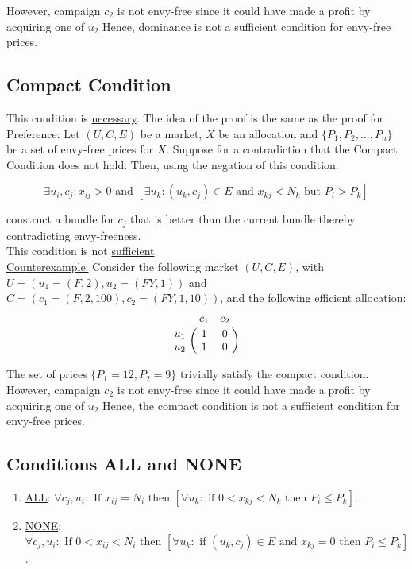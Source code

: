 \documentclass[12pt,letterpaper]{article}
\newcommand{\Campaign}{c}
\newcommand{\Campaigns}{C}
\newcommand{\User}{u}
\newcommand{\Users}{U}
\newcommand{\NumberOfUsers}{N}
\newcommand{\Edges}{E}
\newcommand{\Price}{P}
\newcommand{\AllocationMatrix}{X}
\newcommand{\AllocationMatrixEntry}{x}
\begin{document}
	However, campaign $\Campaign_{2}$ is not envy-free since it could have made a profit by acquiring one of $\User_{2}$ 
	Hence, dominance is not a sufficient condition for envy-free prices.


\subsection*{Compact Condition}

This condition is \underline{necessary}. The idea of the proof is the same as the proof for Preference: 
Let $(\Users,\Campaigns,\Edges)$ be a market, $X$ be an allocation and $\{\Price_1,\Price_2,\ldots,\Price_n\}$ be a set of envy-free prices for $\AllocationMatrix$.
Suppose for a contradiction that the Compact Condition does not hold. Then, using the negation of this condition:

  $$\exists \User_i,\Campaign_j: \AllocationMatrixEntry_{ij}>0 \text{ and } \left[\exists \User_k: (\User_k, \Campaign_j) \in \Edges \text{ and } \AllocationMatrixEntry_{kj} < \NumberOfUsers_{k}\text{ but } \Price_i>\Price_k\right]$$

construct a bundle for $\Campaign_{j}$
that is better than the current bundle thereby contradicting envy-freeness.\\

This condition is not \underline{sufficient}. \\
\underline{Counterexample:}
Consider the following market $(\Users,\Campaigns,\Edges)$, with $\Users =(\User_1 = (F, 2),\User_2 = (FY, 1))$ 
and $\Campaigns =(\Campaign_1 = (F, 2,100),\Campaign_2 = (FY, 1,10))$, and the following efficient allocation:
\[
		\bordermatrix{&\Campaign_1 & \Campaign_2\cr
                	\User_1& 1 	&  0 \cr
                	\User_2& 1  	&  0 }
	\]

	The set of prices $\{P_1 = 12, P_2 = 9\}$ trivially satisfy the compact condition.
	However, campaign $\Campaign_{2}$ is not envy-free since it could have made a profit by acquiring one of $\User_{2}$ 
	Hence, the compact condition is not a sufficient condition for envy-free prices.

\subsection*{Conditions ALL and NONE}

\begin{enumerate}
 \item \underline{ALL}:
 $\forall \Campaign_{j},\User_{i}: \text{ If } \AllocationMatrixEntry_{ij} = \NumberOfUsers_{i} \text{ then } 
 \left[\forall \User_{k}: \text{ if } 0<\AllocationMatrixEntry_{kj}< \NumberOfUsers_{k} \text{ then } \Price_i \le \Price_k \right]$.
\item \underline{NONE}:
 $\forall \Campaign_{j},\User_{i}: \text{ If } 0 < \AllocationMatrixEntry_{ij} < \NumberOfUsers_{i} \text{ then } 
 \left[\forall \User_{k}: \text{ if } (\User_{k},\Campaign_{j})\in\Edges \text{ and } \AllocationMatrixEntry_{kj} = 0  \text{ then } \Price_i \le \Price_k \right]$.
\end{enumerate}
	
\end{document}
